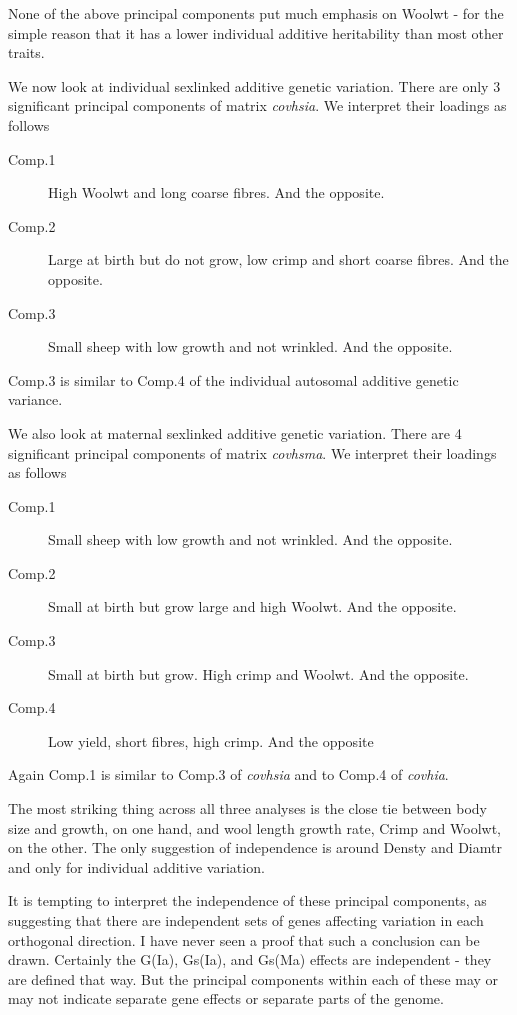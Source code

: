 \documentclass[titlepage]{article}  %
\begin{document}
None of the above principal components put much emphasis on Woolwt - for the simple reason that it has a lower individual additive heritability than most other traits.


 We now look at individual sexlinked additive genetic variation. There are only 3 significant principal components of matrix {\em covhsia}. We interpret their loadings as follows

\begin{description}
\item[Comp.1] High Woolwt and long coarse fibres. And the opposite.
\item[Comp.2] Large at birth but do not grow, low crimp and short coarse fibres. And the opposite.
\item[Comp.3] Small sheep with low growth and not wrinkled. And the opposite.
\end{description}

Comp.3 is similar to Comp.4 of the individual autosomal additive genetic variance.

We also look at maternal sexlinked additive genetic variation. There are 4 significant principal components of matrix {\em covhsma}. We interpret their loadings as follows

\begin{description}
\item[Comp.1] Small sheep with low growth and not wrinkled. And the opposite.
\item[Comp.2] Small at birth but grow large and high Woolwt. And the opposite.
\item[Comp.3] Small at birth but grow. High crimp and Woolwt. And the opposite.
\item[Comp.4] Low yield, short fibres, high crimp. And the opposite
\end{description}

Again Comp.1 is similar to Comp.3 of {\em covhsia} and to Comp.4 of {\em covhia}.

The most striking thing across all three analyses is the close tie between body size and growth, on one hand, and wool length growth rate, Crimp and Woolwt, on the other. The only suggestion of independence is around Densty and Diamtr and only for individual additive variation.

It is tempting to interpret the independence of these principal components, as suggesting that there are independent sets of genes affecting variation in each orthogonal direction. I have never seen a proof that such a conclusion can be drawn. Certainly the G(Ia), Gs(Ia), and Gs(Ma) effects are independent - they are defined that way. But the principal components within each of these may or may not indicate separate gene effects or separate parts of the genome.
\end{document}
